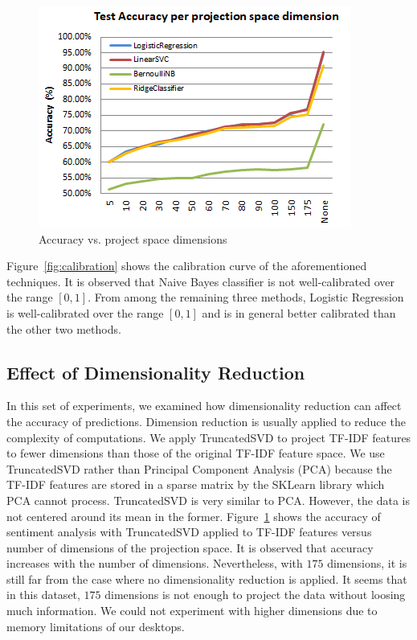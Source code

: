\begin{figure}[tbh]%
\centering
\includegraphics[width=0.9\columnwidth]{figures/dim_reduction_accuracy.png}%
\caption{Accuracy vs. project space dimensions}%
\label{fig:dim-reduction}%
\end{figure}
Figure~\ref{fig:calibration} shows the calibration curve of the aforementioned techniques. It is observed that Naive Bayes classifier is not well-calibrated over the range $[0,1]$. From among the remaining three methods, Logistic Regression is well-calibrated over the range $[0,1]$ and is in general better calibrated than the other two methods.


\subsection{Effect of Dimensionality Reduction}
\label{sec:dim-reduction}
In this set of experiments, we examined how dimensionality reduction can affect the accuracy of predictions. Dimension reduction is usually applied to reduce the complexity of computations. We apply TruncatedSVD to project TF-IDF features to fewer dimensions than those of the original TF-IDF feature space. We use TruncatedSVD rather than Principal Component Analysis (PCA) because the TF-IDF features are stored in a sparse matrix by the SKLearn library which PCA cannot process. TruncatedSVD is very similar to PCA. However, the data is not centered around its mean in the former.
Figure~\ref{fig:dim-reduction} shows the accuracy of sentiment analysis with TruncatedSVD applied to TF-IDF features versus number of dimensions of the projection space. It is observed that accuracy increases with the number of dimensions. Nevertheless, with $175$ dimensions, it is still far from the case where no dimensionality reduction is applied. It seems that in this dataset, $175$ dimensions is not enough to project the data without loosing much information. We could not experiment with higher dimensions due to memory limitations of our desktops.


